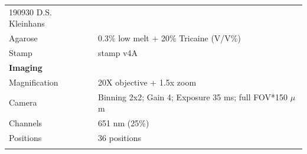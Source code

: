 \documentclass[11pt,singlespacinge,twoside]{reedthesis} %
\begin{document}
\begin{longtable}[]{@{}ll@{}}
\begin{minipage}[t]{0.73\columnwidth}
190930 D.S. Kleinhans\strut
\end{minipage}\tabularnewline
\begin{minipage}[t]{0.21\columnwidth}\raggedright
Agarose\strut
\end{minipage} & \begin{minipage}[t]{0.73\columnwidth}\raggedright
0.3\% low melt + 20\% Tricaine (V/V\%)\strut
\end{minipage}\tabularnewline
\begin{minipage}[t]{0.21\columnwidth}\raggedright
Stamp\strut
\end{minipage} & \begin{minipage}[t]{0.73\columnwidth}\raggedright
stamp v4A\strut
\end{minipage}\tabularnewline
\begin{minipage}[t]{0.21\columnwidth}\raggedright
\textbf{Imaging}\strut
\end{minipage} & \begin{minipage}[t]{0.73\columnwidth}\raggedright
\strut
\end{minipage}\tabularnewline
\begin{minipage}[t]{0.21\columnwidth}\raggedright
Magnification\strut
\end{minipage} & \begin{minipage}[t]{0.73\columnwidth}\raggedright
20X objective + 1.5x zoom\strut
\end{minipage}\tabularnewline
\begin{minipage}[t]{0.21\columnwidth}\raggedright
Camera\strut
\end{minipage} & \begin{minipage}[t]{0.73\columnwidth}\raggedright
Binning 2x2; Gain 4; Exposure 35 ms; full FOV*150 \(\mu\)m\strut
\end{minipage}\tabularnewline
\begin{minipage}[t]{0.21\columnwidth}\raggedright
Channels\strut
\end{minipage} & \begin{minipage}[t]{0.73\columnwidth}\raggedright
651 nm (25\%)\strut
\end{minipage}\tabularnewline
\begin{minipage}[t]{0.21\columnwidth}\raggedright
Positions\strut
\end{minipage} & \begin{minipage}[t]{0.73\columnwidth}\raggedright
36 positions\strut
\end{minipage}\tabularnewline
\begin{minipage}[t]{0.21\columnwidth}\raggedright

\end{minipage}
\end{longtable}
\end{document}
